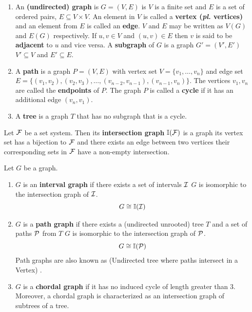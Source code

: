 \begin{definition}
  \label{def:graphtree}
  \begin{enumerate}
    \hangindent {}
  \item An \textbf{(undirected) graph} is $G = (V,E)$ is \stt $V$ is a
    finite set and $E$ is a set of ordered pairs, $E \subseteq V
    \times V$. An element in $V$ is called a \textbf{vertex
      (\emph{pl.} vertices)} and an element from $E$ is called an
    \textbf{edge}. $V$ and $E$ may be written as $V(G)$ and $E(G)$
    respectively. If $u,v \in V$ and $(u,v) \in E$ then $v$ is said to
    be \textbf{adjacent} to $u$ and vice versa. A \textbf{subgraph} of
    $G$ is a graph $G' = (V',E')$ \stt $V' \subseteq V$ and $E'
    \subseteq E$.

  \item A \textbf{path} is a graph $P = (V,E)$ with vertex set $V =
    \{v_1,\ldots,v_n\}$ and edge set $E= \{ (v_1,v_2),(v_2,v_3),
    \ldots,(v_{n-2},v_{n-1}),(v_{n-1},v_{n})\}$. The vertices $v_1,
    v_n$ are called the \textbf{endpoints} of $P$. The graph $P$ is
    called a \textbf{cycle} if it has an additional edge $(v_n,v_1)$.

  \item A \textbf{tree} is a graph $T$ that has no subgraph that is a
    cycle.
  \end{enumerate}
\end{definition}


\begin{definition}
  \label{def:intersectiongraph}
  Let ${\cal F}$ be a set system. Then its \textbf{intersection graph}
  $\mathbb I({\cal F})$ is a graph \stt its vertex set has a bijection to ${\cal F}$
  and there exists an edge between two vertices \iff their
  corresponding sets in ${\cal F}$ have a non-empty intersection.
\end{definition}

\begin{definition}
  \label{def:pathgraph}
  Let $G$ be a graph.
  \begin{enumerate}
  \hangindent {}
\item $G$ is an \textbf{interval graph} if there exists a set of
  intervals ${\cal I}$ \stt $G$ is isomorphic to the intersection graph of
  ${\cal I}$. \[G \cong \mathbb I({\cal I})\]
  \item $G$ is a \textbf{path graph} if there exists a (undirected
    unrooted) tree $T$ and a set of paths ${\cal P}$ from $T$ \stt $G$ is
    isomorphic to the intersection graph of ${\cal P}$. \[G \cong
    \mathbb I({\cal P})\] Path graphs are also known as \uvgraphs (Undirected
    tree where paths intersect in a Vertex) \cite{mw86}.
  \item $G$ is a \textbf{chordal graph} if it has no induced cycle of
    length greater than 3. Moreover, a chordal graph is characterized
    as an intersection graph of subtrees of a tree.
  \end{enumerate}
\end{definition}

